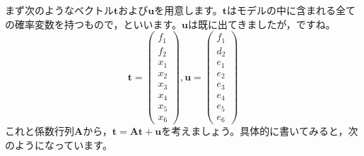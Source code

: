 \documentclass{ltjsbook}
\begin{document}
まず次のようなベクトル$\bm{t}$および$\bm{u}$を用意します。$\bm{t}$はモデルの中に含まれる全ての確率変数を持つもので，といいます。$\bm{u}$は既に出てきましたが，ですね。
\[ \bm{t} = \begin{pmatrix} f_1\\f_2\\x_1\\x_2\\x_3\\x_4\\x_5\\x_6 \end{pmatrix},
	\bm{u} = \begin{pmatrix} f_1\\d_2\\e_1\\e_2\\e_3\\e_4\\e_5\\e_6 \end{pmatrix}
\]
これと係数行列$\bm{A}$から，$\bm{t} = \bm{At}+\bm{u}$を考えましょう。具体的に書いてみると，次のようになっています。
\end{document}
